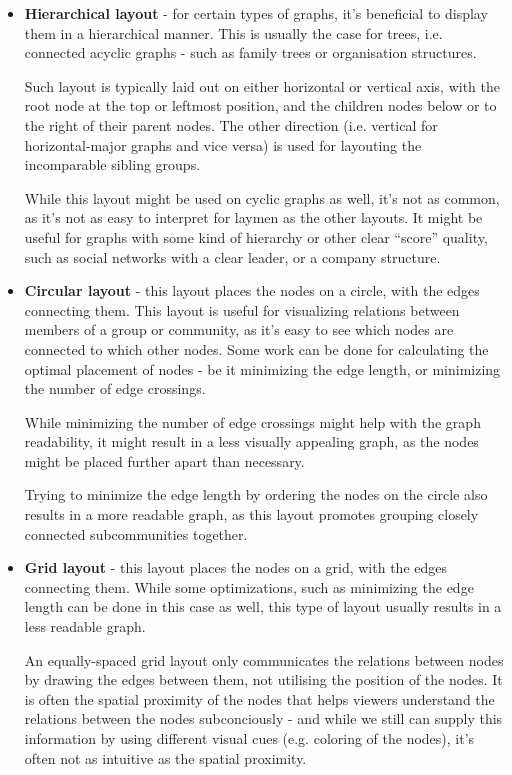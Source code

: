 \begin{itemize}
    \item \textbf{Hierarchical layout} - for certain types of graphs, it's beneficial to display them in a hierarchical manner. 
    This is usually the case for trees, i.e. connected acyclic graphs - such as family trees or organisation structures.

    Such layout is typically laid out on either horizontal or vertical axis, with the root node at the top or leftmost position, and the children nodes below or to the right of their parent nodes.
    The other direction (i.e. vertical for horizontal-major graphs and vice versa) is used for layouting the incomparable sibling groups.
    
    While this layout might be used on cyclic graphs as well, it's not as common, as it's not as easy to interpret for laymen as the other layouts.
    It might be useful for graphs with some kind of hierarchy or other clear ``score'' quality, such as social networks with a clear leader, or a company structure.

    \item \textbf{Circular layout} - this layout places the nodes on a circle, with the edges connecting them. 
    This layout is useful for visualizing relations between members of a group or community, as it's easy to see which nodes are connected to which other nodes.
    Some work can be done for calculating the optimal placement of nodes - be it minimizing the edge length, or minimizing the number of edge crossings.

    While minimizing the number of edge crossings might help with the graph readability, it might result in a less visually appealing graph, as the nodes might be placed further apart than necessary.

    Trying to minimize the edge length by ordering the nodes on the circle also results in a more readable graph, as this layout promotes grouping closely connected subcommunities together.

    \item \textbf{Grid layout} - this layout places the nodes on a grid, with the edges connecting them.
    While some optimizations, such as minimizing the edge length can be done in this case as well, 
    this type of layout usually results in a less readable graph.

    An equally-spaced grid layout only communicates the relations between nodes by drawing the edges between them, not utilising the position of the nodes.
    It is often the spatial proximity of the nodes that helps viewers understand the relations between the nodes subconciously - and while we still can 
    supply this information by using different visual cues (e.g. coloring of the nodes), it's often not as intuitive as the spatial proximity.


\end{itemize}
